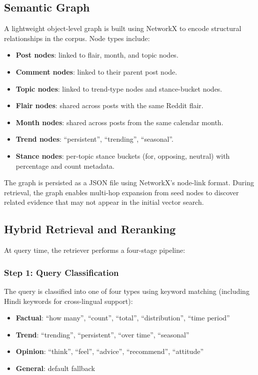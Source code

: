 \documentclass[11pt,a4paper]{article}
\begin{document}
\subsection{Semantic Graph}
\label{sec:graph}

A lightweight object-level graph is built using NetworkX to encode structural relationships in the corpus. Node types include:

\begin{itemize}[leftmargin=*]
  \item \textbf{Post nodes}: linked to flair, month, and topic nodes.
  \item \textbf{Comment nodes}: linked to their parent post node.
  \item \textbf{Topic nodes}: linked to trend-type nodes and stance-bucket nodes.
  \item \textbf{Flair nodes}: shared across posts with the same Reddit flair.
  \item \textbf{Month nodes}: shared across posts from the same calendar month.
  \item \textbf{Trend nodes}: ``persistent'', ``trending'', ``seasonal''.
  \item \textbf{Stance nodes}: per-topic stance buckets (for, opposing, neutral) with percentage and count metadata.
\end{itemize}

The graph is persisted as a JSON file using NetworkX's node-link format. During retrieval, the graph enables multi-hop expansion from seed nodes to discover related evidence that may not appear in the initial vector search.


\subsection{Hybrid Retrieval and Reranking}
\label{sec:retrieval}

At query time, the retriever performs a four-stage pipeline:

\subsubsection{Step 1: Query Classification}

The query is classified into one of four types using keyword matching (including Hindi keywords for cross-lingual support):
\begin{itemize}[leftmargin=*]
  \item \textbf{Factual}: ``how many'', ``count'', ``total'', ``distribution'', ``time period''
  \item \textbf{Trend}: ``trending'', ``persistent'', ``over time'', ``seasonal''
  \item \textbf{Opinion}: ``think'', ``feel'', ``advice'', ``recommend'', ``attitude''
  \item \textbf{General}: default fallback
\end{itemize}
\end{document}
